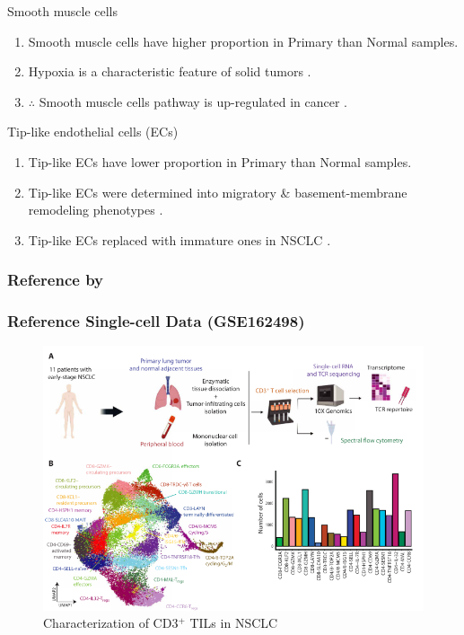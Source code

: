 \documentclass{beamer}
\begin{document}
\begin{frame}[allowframebreaks]
        \begin{block}{Smooth muscle cells}
            \begin{enumerate}
                \item Smooth muscle cells have higher proportion in Primary than Normal samples.
                \item Hypoxia is a characteristic feature of solid tumors \cite{hypoxia-1, hypoxia-2}.
                \item $\therefore$ Smooth muscle cells pathway is up-regulated in cancer \cite{smooth-1, smooth-2}.
            \end{enumerate}
        \end{block}

        \begin{block}{Tip-like endothelial cells (ECs)}
            \begin{enumerate}
                \item Tip-like ECs have lower proportion in Primary than Normal samples.
                \item Tip-like ECs were determined into migratory \& basement-membrane remodeling phenotypes \cite{tip-2}.
                \item Tip-like ECs replaced with immature ones in NSCLC \cite{tip-1}.
            \end{enumerate}
        \end{block}
    \end{frame}

    \subsubsection{Reference by \protect{}}
    \begin{frame}
        \frametitle{Reference Single-cell Data (GSE162498)}

        \begin{figure}
            \includegraphics[width=0.8 \linewidth]{figures/LungCancer/reference_2.png}
            \caption{Characterization of CD3$^+$ TILs in NSCLC \protect\cite{singlecell2}}
        \end{figure}
    \end{frame}
\end{document}
